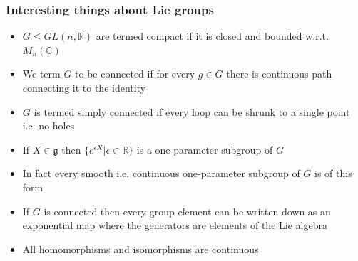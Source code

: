 \subsubsection{Interesting things about Lie groups}
\begin{itemize}
    \item $G \leq GL(n,\mathbb{R})$ are termed compact if it is closed and bounded w.r.t. $M_{n}(\mathbb{C})$
    \item We term $G$ to be connected if for every $g \in G$ there is continuous path connecting it to the identity
    \item $G$ is termed simply connected if every loop can be shrunk to a single point i.e. no holes
    \item If $X \in \mathfrak{g}$ then $\{e^{\epsilon X} | \epsilon \in \mathbb{R}\}$ is a one parameter subgroup of $G$
    \item In fact every smooth i.e. continuous one-parameter subgroup of $G$ is of this form
    \item If $G$ is connected then every group element can be written down as an exponential map where the generators are elements of the Lie algebra
    \item All homomorphisms and isomorphisms are continuous
\end{itemize}
